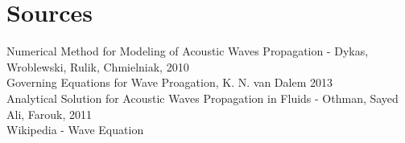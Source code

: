 \documentclass{article}
\begin{document}
\section{Sources}
Numerical Method for Modeling of Acoustic Waves Propagation - Dykas, Wroblewski, Rulik, Chmielniak, 2010\\
Governing Equations for Wave Proagation, K. N. van Dalem 2013\\
Analytical Solution for Acoustic Waves Propagation in Fluids - Othman, Sayed Ali, Farouk, 2011\\
Wikipedia - Wave Equation\\
\end{document}
